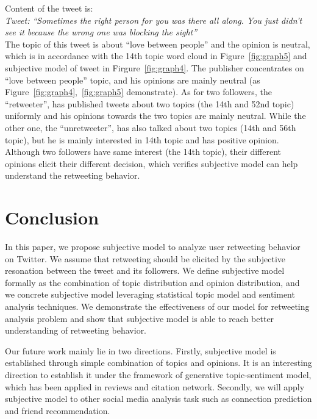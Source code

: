 \documentclass{acm_proc_article-sp}
\begin{document}
Content of the tweet is:\\
\textit{Tweet: ``Sometimes the right person for you was there all along. You just didn’t see it because the wrong one was blocking the sight''} \\
The topic of this tweet is about ``love between people'' and the opinion is neutral, which is in accordance with the 14th topic word cloud in Figure~\ref{fig:graph5} and subjective model of tweet in Firgure~\ref{fig:graph4}.
The publisher concentrates on ``love between people'' topic, and his opinions are mainly neutral (as Figure~\ref{fig:graph4},~\ref{fig:graph5} demonstrate).
As for two followers, the ``retweeter'', has published tweets about two topics (the 14th and 52nd topic) uniformly and his opinions towards the two topics are mainly neutral.
While the other one, the ``unretweeter'', has also talked about two topics (14th and 56th topic), but he is mainly interested in 14th topic and has positive opinion.
Although two followers have same interest (the 14th topic), their different opinions elicit their different decision, which verifies subjective model can help understand the retweeting behavior.

\section{Conclusion}
In this paper, we propose subjective model to analyze user retweeting behavior on Twitter. We assume that retweeting should be elicited by the subjective resonation between the tweet and its followers. 
We define subjective model formally as the combination of topic distribution and opinion distribution, and we concrete subjective model leveraging statistical topic model and sentiment analysis techniques.
We demonstrate the effectiveness of our model for retweeting analysis problem and show that subjective model is able to reach better understanding of retweeting behavior. 

Our future work mainly lie in two directions.
Firstly, subjective model is established through simple combination of topics and opinions. It is an interesting direction to establish it under the framework of generative topic-sentiment model, which has been applied in reviews and citation network.
Secondly, we will apply subjective model to other social media analysis task such as connection prediction and friend recommendation.


\end{document}
